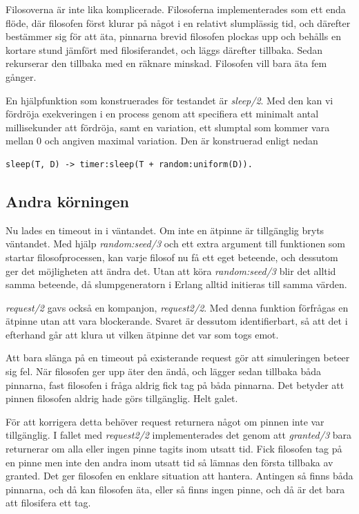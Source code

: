 \documentclass[a4paper, 11pt]{article}
\begin{document}
Filosoverna är inte lika komplicerade. Filosoferna implementerades som ett enda flöde, där filosofen först klurar på något
i en relativt slumplässig tid, och därefter bestämmer sig för att äta, pinnarna brevid filosofen plockas upp och behålls en
kortare stund jämfört med filosiferandet, och läggs därefter tillbaka. Sedan rekurserar den tillbaka med en räknare
minskad. Filosofen vill bara äta fem gånger. 

En hjälpfunktion som konstruerades för testandet är \emph{sleep/2}. Med den kan vi fördröja exekveringen i en process genom
att specifiera ett minimalt antal millisekunder att fördröja, samt en variation, ett slumptal som kommer vara mellan 0 och angiven
maximal variation. Den är konstruerad enligt nedan
\begin{verbatim}
sleep(T, D) -> timer:sleep(T + random:uniform(D)).
\end{verbatim}


\subsection{Andra körningen}

Nu lades en timeout in i väntandet. Om inte en ätpinne är tillgänglig bryts väntandet. Med hjälp \emph{random:seed/3} och
ett extra argument till funktionen som startar filosofprocessen, kan varje filosof nu få ett eget beteende, och dessutom
ger det möjligheten att ändra det. Utan att köra \emph{random:seed/3} blir det alltid samma beteende, då slumpgeneratorn
i Erlang alltid initieras till samma värden.

\emph{request/2} gavs också en kompanjon, \emph{request2/2}. Med denna funktion förfrågas en ätpinne utan att vara blockerande.
Svaret är dessutom identifierbart, så att det i efterhand går att klura ut vilken ätpinne det var som togs emot.

Att bara slänga på en timeout på existerande request gör att simuleringen beteer sig fel. När filosofen ger upp äter den ändå,
och lägger sedan tillbaka båda pinnarna, fast filosofen i fråga aldrig fick tag på båda pinnarna. Det betyder att pinnen filosofen
aldrig hade görs tillgänglig. Helt galet.

För att korrigera detta behöver request returnera något om pinnen inte var tillgänglig. I fallet med \emph{request2/2} implementerades
det genom att \emph{granted/3} bara returnerar om alla eller ingen pinne tagits inom utsatt tid. Fick filosofen tag på en pinne men inte
den andra inom utsatt tid så lämnas den första tillbaka av granted. Det ger filosofen en enklare situation att hantera. Antingen så
finns båda pinnarna, och då kan filosofen äta, eller så finns ingen pinne, och då är det bara att filosifera ett tag.
\end{document}

